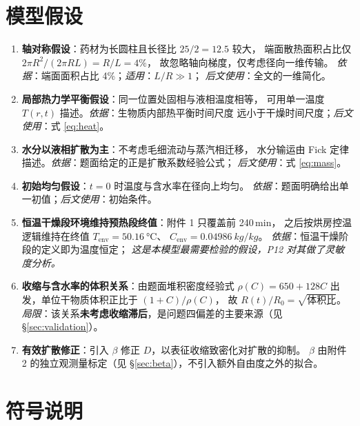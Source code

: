 \documentclass[withoutpreface,bwprint]{cumcmthesis}
\begin{document}
\section{模型假设}

\begin{enumerate}
  \item \textbf{轴对称假设}：药材为长圆柱且长径比 $25/2=12.5$ 较大，
        端面散热面积占比仅 $2\pi R^2/(2\pi RL)=R/L=4\%$，
        故忽略轴向梯度，仅考虑径向一维传输。
        \textit{依据}：端面面积占比 4\%；\textit{适用}：$L/R\gg1$；
        \textit{后文使用}：全文的一维简化。
  \item \textbf{局部热力学平衡假设}：同一位置处固相与液相温度相等，
        可用单一温度 $T(r,t)$ 描述。\textit{依据}：生物质内部热平衡时间尺度
        远小于干燥时间尺度；\textit{后文使用}：式 \eqref{eq:heat}。
  \item \textbf{水分以液相扩散为主}：不考虑毛细流动与蒸汽相迁移，
        水分输运由 Fick 定律描述。\textit{依据}：题面给定的正是扩散系数经验公式；
        \textit{后文使用}：式 \eqref{eq:mass}。
  \item \textbf{初始均匀假设}：$t=0$ 时温度与含水率在径向上均匀。
        \textit{依据}：题面明确给出单一初值；\textit{后文使用}：初始条件。
  \item \textbf{恒温干燥段环境维持预热段终值}：附件 1 只覆盖前 240\,min，
        之后按烘房控温逻辑维持在终值 $T_{\text{env}}=\SI{50.16}{\celsius}$、
        $C_{\text{env}}=\SI{0.04986}{kg/kg}$。
        \textit{依据}：恒温干燥阶段的定义即为温度恒定；
        \textit{这是本模型最需要检验的假设，P12 对其做了灵敏度分析。}
  \item \textbf{收缩与含水率的体积关系}：由题面堆积密度经验式
        $\rho(C)=650+128C$ 出发，单位干物质体积正比于 $(1+C)/\rho(C)$，
        故 $R(t)/R_0=\sqrt{\text{体积比}}$。
        \textit{局限}：该关系\textbf{未考虑收缩滞后}，是问题四偏差的主要来源（见 \S\ref{sec:validation}）。
  \item \textbf{有效扩散修正}：引入 $\beta$ 修正 $D$，以表征收缩致密化对扩散的抑制。
        $\beta$ 由附件 2 的独立观测量标定（见 \S\ref{sec:beta}），不引入额外自由度之外的拟合。
\end{enumerate}

\section{符号说明}
\end{document}
